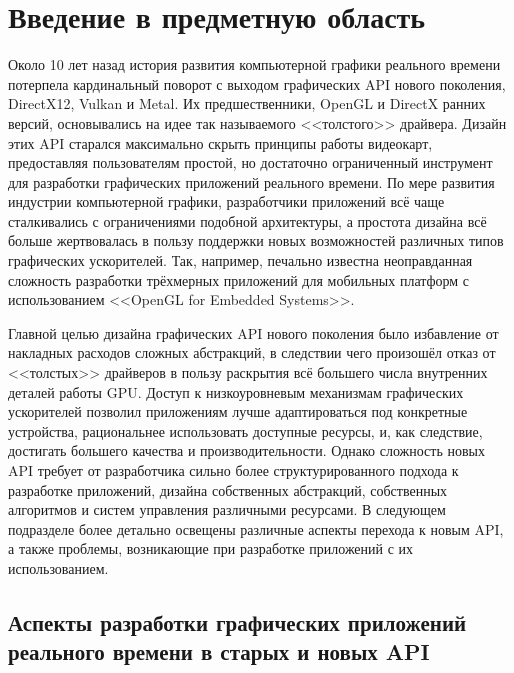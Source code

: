 \section{Введение в предметную область}
Около 10 лет назад история развития компьютерной графики реального времени потерпела кардинальный поворот с выходом графических API нового поколения, DirectX12, Vulkan и Metal.
Их предшественники, OpenGL и DirectX ранних версий, основывались на идее так называемого <<толстого>> драйвера.
Дизайн этих API старался максимально скрыть принципы работы видеокарт, предоставляя пользователям простой, но достаточно ограниченный инструмент для разработки графических приложений реального времени.
По мере развития индустрии компьютерной графики, разработчики приложений всё чаще сталкивались с ограничениями подобной архитектуры, а простота дизайна всё больше жертвовалась в пользу поддержки новых возможностей различных типов графических ускорителей.
Так, например, печально известна неоправданная сложность разработки трёхмерных приложений для мобильных платформ с использованием <<OpenGL for Embedded Systems>>.

Главной целью дизайна графических API нового поколения было избавление от накладных расходов сложных абстракций, в следствии чего произошёл отказ от <<толстых>> драйверов в пользу раскрытия всё большего числа внутренних деталей работы GPU.
Доступ к низкоуровневым механизмам графических ускорителей позволил приложениям лучше адаптироваться под конкретные устройства, рациональнее использовать доступные ресурсы, и, как следствие, достигать большего качества и производительности.
Однако сложность новых API требует от разработчика сильно более структурированного подхода к разработке приложений, дизайна собственных абстракций, собственных алгоритмов и систем управления различными ресурсами.
В следующем подразделе более детально освещены различные аспекты перехода к новым API, а также проблемы, возникающие при разработке приложений с их использованием.

\subsection{Аспекты разработки графических приложений реального времени в старых и новых API}

